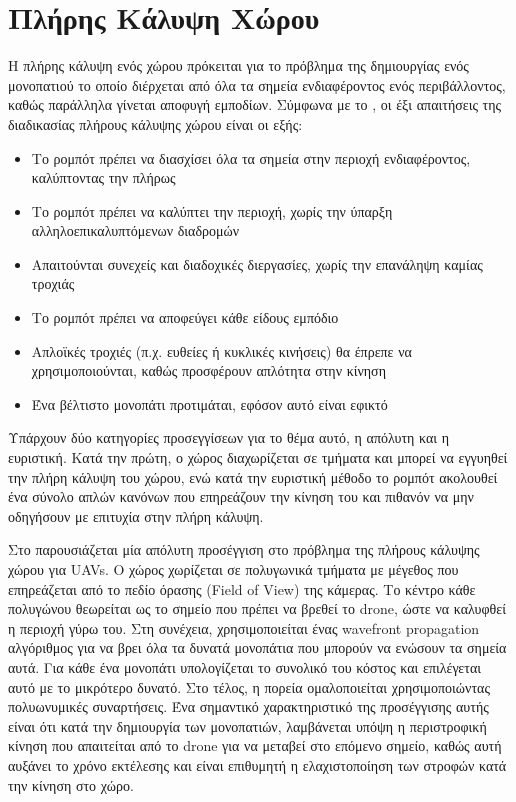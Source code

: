 \section{Πλήρης Κάλυψη Χώρου}
\label{section:coverage}

Η πλήρης κάλυψη ενός χώρου πρόκειται για το πρόβλημα της δημιουργίας ενός μονοπατιού το οποίο διέρχεται από όλα τα σημεία ενδιαφέροντος ενός περιβάλλοντος, καθώς παράλληλα γίνεται αποφυγή εμποδίων. Σύμφωνα με το \cite{galceran2013}, οι έξι απαιτήσεις της διαδικασίας πλήρους κάλυψης χώρου είναι οι εξής:
\begin{itemize}

    \item{Το ρομπότ πρέπει να διασχίσει όλα τα σημεία στην περιοχή ενδιαφέροντος, καλύπτοντας την πλήρως}
    \item{Το ρομπότ πρέπει να καλύπτει την περιοχή, χωρίς την ύπαρξη αλληλοεπικαλυπτόμενων διαδρομών}
    \item{Απαιτούνται συνεχείς και διαδοχικές διεργασίες, χωρίς την επανάληψη καμίας τροχιάς}
    \item{Το ρομπότ πρέπει να αποφεύγει κάθε είδους εμπόδιο}
    \item{Απλοϊκές τροχιές (π.χ. ευθείες ή κυκλικές κινήσεις) θα έπρεπε να χρησιμοποιούνται, καθώς προσφέρουν απλότητα στην κίνηση}
    \item{Ένα βέλτιστο μονοπάτι προτιμάται, εφόσον αυτό είναι εφικτό}

\end{itemize}

Υπάρχουν δύο κατηγορίες προσεγγίσεων για το θέμα αυτό, η απόλυτη και η ευριστική. Κατά την πρώτη, ο χώρος διαχωρίζεται σε τμήματα και μπορεί να εγγυηθεί την πλήρη κάλυψη του χώρου, ενώ κατά την ευριστική μέθοδο το ρομπότ ακολουθεί ένα σύνολο απλών κανόνων που επηρεάζουν την κίνηση του και πιθανόν να μην οδηγήσουν με επιτυχία στην πλήρη κάλυψη.

Στο \cite{7496385} παρουσιάζεται μία απόλυτη προσέγγιση στο πρόβλημα της πλήρους κάλυψης χώρου για UAVs. Ο χώρος χωρίζεται σε πολυγωνικά τμήματα με μέγεθος που επηρεάζεται από το πεδίο όρασης (Field of View) της κάμερας. Το κέντρο κάθε πολυγώνου θεωρείται ως το σημείο που πρέπει να βρεθεί το drone, ώστε να καλυφθεί η περιοχή γύρω του. Στη συνέχεια, χρησιμοποιείται ένας wavefront propagation αλγόριθμος για να βρει όλα τα δυνατά μονοπάτια που μπορούν να ενώσουν τα σημεία αυτά. Για κάθε ένα μονοπάτι υπολογίζεται το συνολικό του κόστος και επιλέγεται αυτό με το μικρότερο δυνατό. Στο τέλος, η πορεία ομαλοποιείται χρησιμοποιώντας πολυωνυμικές συναρτήσεις. Ένα σημαντικό χαρακτηριστικό της προσέγγισης αυτής είναι ότι κατά την δημιουργία των μονοπατιών, λαμβάνεται υπόψη η περιστροφική κίνηση που απαιτείται από το drone για να μεταβεί στο επόμενο σημείο, καθώς αυτή αυξάνει το χρόνο εκτέλεσης και είναι επιθυμητή η ελαχιστοποίηση των στροφών κατά την κίνηση στο χώρο.

